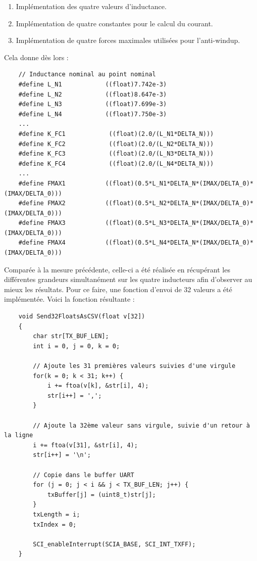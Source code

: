 \begin{enumerate}
    \item Implémentation des quatre valeurs d'inductance.
    \item Implémentation de quatre constantes pour le calcul du courant.
    \item Implémentation de quatre forces maximales utilisées pour l'anti-windup.
\end{enumerate}

Cela donne dès lors :

\begin{verbatim}
    // Inductance nominal au point nominal
    #define L_N1            ((float)7.742e-3)
    #define L_N2            ((float)8.647e-3)
    #define L_N3            ((float)7.699e-3)
    #define L_N4            ((float)7.750e-3)
    ...
    #define K_FC1            ((float)(2.0/(L_N1*DELTA_N)))
    #define K_FC2            ((float)(2.0/(L_N2*DELTA_N)))
    #define K_FC3            ((float)(2.0/(L_N3*DELTA_N)))
    #define K_FC4            ((float)(2.0/(L_N4*DELTA_N)))
    ...
    #define FMAX1           ((float)(0.5*L_N1*DELTA_N*(IMAX/DELTA_0)*(IMAX/DELTA_0)))
    #define FMAX2           ((float)(0.5*L_N2*DELTA_N*(IMAX/DELTA_0)*(IMAX/DELTA_0)))
    #define FMAX3           ((float)(0.5*L_N3*DELTA_N*(IMAX/DELTA_0)*(IMAX/DELTA_0)))
    #define FMAX4           ((float)(0.5*L_N4*DELTA_N*(IMAX/DELTA_0)*(IMAX/DELTA_0)))
\end{verbatim}

Comparée à la mesure précédente, celle-ci a été réalisée en récupérant les différentes grandeurs simultanément sur les quatre inducteurs afin d'observer au mieux les résultats. Pour ce faire, une fonction d'envoi de 32 valeurs a été implémentée. Voici la fonction résultante :

\begin{verbatim}
    void Send32FloatsAsCSV(float v[32])
    {
        char str[TX_BUF_LEN];
        int i = 0, j = 0, k = 0;

        // Ajoute les 31 premières valeurs suivies d'une virgule
        for(k = 0; k < 31; k++) {
            i += ftoa(v[k], &str[i], 4);
            str[i++] = ',';
        }

        // Ajoute la 32ème valeur sans virgule, suivie d'un retour à la ligne
        i += ftoa(v[31], &str[i], 4);
        str[i++] = '\n';

        // Copie dans le buffer UART
        for (j = 0; j < i && j < TX_BUF_LEN; j++) {
            txBuffer[j] = (uint8_t)str[j];
        }
        txLength = i;
        txIndex = 0;

        SCI_enableInterrupt(SCIA_BASE, SCI_INT_TXFF);
    }
\end{verbatim}

